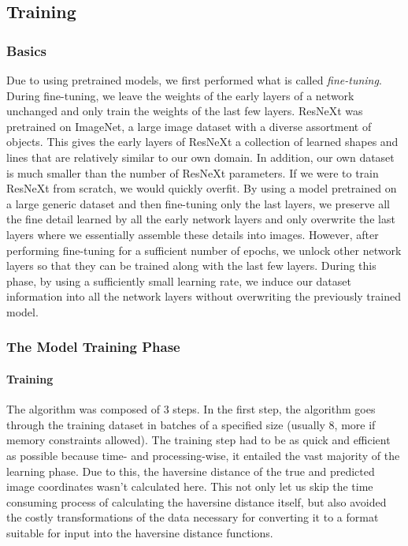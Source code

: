 \documentclass[]{article}
\let\oldparagraph\paragraph
\renewcommand{\paragraph}[1]{\oldparagraph{#1}\mbox{}}
\begin{document}
\hypertarget{training}{%
\subsection{Training}\label{training}}

\hypertarget{basics}{%
\subsubsection{Basics}\label{basics}}

Due to using pretrained models, we first performed what is called
\emph{fine-tuning}. During fine-tuning, we leave the weights of the
early layers of a network unchanged and only train the weights of the
last few layers. ResNeXt was pretrained on ImageNet, a large image
dataset with a diverse assortment of objects. This gives the early
layers of ResNeXt a collection of learned shapes and lines that are
relatively similar to our own domain. In addition, our own dataset is
much smaller than the number of ResNeXt parameters. If we were to train
ResNeXt from scratch, we would quickly overfit. By using a model
pretrained on a large generic dataset and then fine-tuning only the last
layers, we preserve all the fine detail learned by all the early network
layers and only overwrite the last layers where we essentially assemble
these details into images. However, after performing fine-tuning for a
sufficient number of epochs, we unlock other network layers so that they
can be trained along with the last few layers. During this phase, by
using a sufficiently small learning rate, we induce our dataset
information into all the network layers without overwriting the
previously trained model.

\hypertarget{the-model-training-phase}{%
\subsubsection{The Model Training
Phase}\label{the-model-training-phase}}

\hypertarget{training-1}{%
\paragraph{Training}\label{training-1}}

The algorithm was composed of 3 steps. In the first step, the algorithm
goes through the training dataset in batches of a specified size
(usually 8, more if memory constraints allowed). The training step had
to be as quick and efficient as possible because time- and
processing-wise, it entailed the vast majority of the learning phase.
Due to this, the haversine distance of the true and predicted image
coordinates wasn't calculated here. This not only let us skip the time
consuming process of calculating the haversine distance itself, but also
avoided the costly transformations of the data necessary for converting
it to a format suitable for input into the haversine distance functions.
\end{document}
